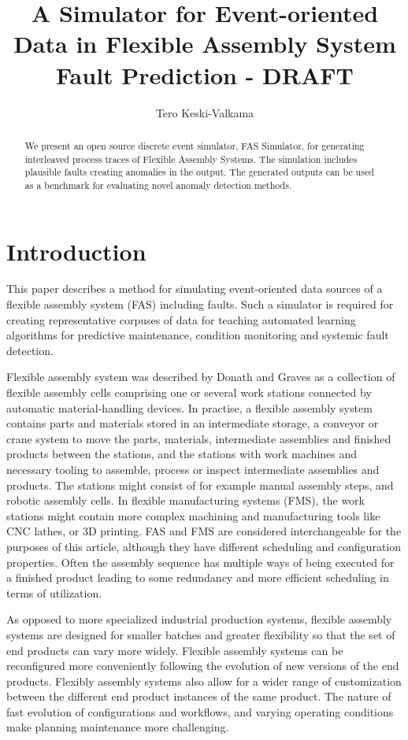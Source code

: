 \documentclass[procedia]{easychair}
\title{A Simulator for Event-oriented Data in Flexible Assembly System Fault Prediction - DRAFT}
\author{Tero Keski-Valkama}
\begin{document}
\begin{abstract}
We present an open source discrete event simulator, FAS Simulator, for generating interleaved process traces of Flexible Assembly Systems. The simulation includes plausible faults creating anomalies in the output.
The generated outputs can be used as a benchmark for evaluating novel anomaly detection methods.
\end{abstract}

\section{Introduction}
This paper describes a method for simulating event-oriented data sources of a flexible assembly system (FAS) including faults. Such a simulator is required for creating representative corpuses
of data for teaching automated learning algorithms for predictive maintenance, condition monitoring and systemic fault detection.

Flexible assembly system was described by Donath and Graves \cite{donath1988flexible} as a collection of flexible assembly cells comprising one or several work stations connected by automatic material-handling devices.
In practise, a flexible assembly system contains parts and materials stored in an intermediate storage,
a conveyor or crane system to move the parts, materials, intermediate assemblies and finished products between the stations, and the stations with work machines and necessary tooling
to assemble, process or inspect intermediate assemblies and products. The stations might consist of for example manual assembly steps, and robotic assembly cells. In flexible manufacturing systems (FMS),
the work stations might contain more complex machining and manufacturing tools like CNC lathes, or 3D printing. FAS and FMS are considered interchangeable for the purposes of this article, although
they have different scheduling and configuration properties.
Often the assembly sequence has multiple ways of being executed for a finished product leading to some redundancy and more efficient scheduling in terms of utilization.

As opposed to more specialized industrial production systems, flexible assembly systems are designed for smaller batches and greater flexibility so that the set of end products can vary more widely.
Flexible assembly systems can be reconfigured more conveniently following the evolution of new versions of the end products. Flexibly assembly systems also allow for a wider range
of customization between the different end product instances of the same product. The nature of fast evolution of configurations and workflows, and varying operating conditions make
planning maintenance more challenging.
\end{document}

